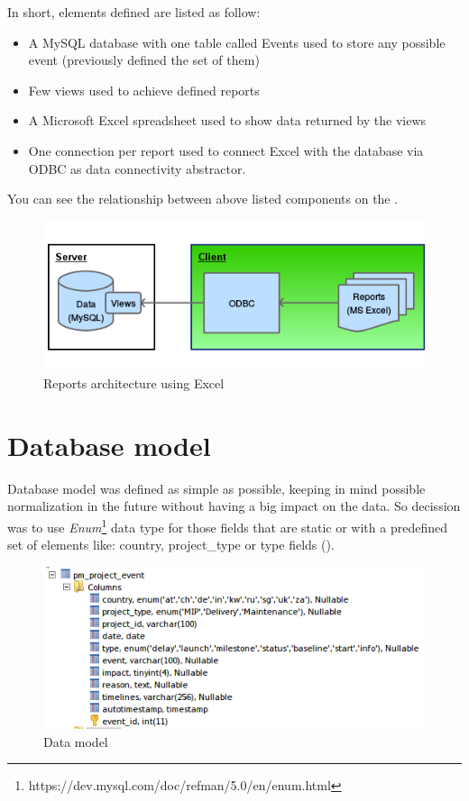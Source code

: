 In short, elements defined are listed as follow:
\begin{itemize}
  \item A MySQL database with one table called Events used to store any possible
  event (previously defined the set of them)
  \item Few views used to achieve defined reports
  \item A Microsoft Excel spreadsheet used to show data returned by the views
  \item One connection per report used to connect Excel with the database
  via ODBC as data connectivity abstractor. 
\end{itemize}

You can see the relationship between above listed components on the 
.
 
\begin{figure}[ht!]
	\centering
   	\includegraphics[width=1\textwidth]{./resources/excel_architecture.png}
   	\caption{Reports architecture using Excel}
   	\label{f_excel_architecture}
\end{figure}

\section{Database model}
Database model was defined as simple as possible, keeping in mind
possible normalization in the future without having a big impact on the data. So
decission was to use
\emph{Enum}\footnote{https://dev.mysql.com/doc/refman/5.0/en/enum.html} data
type for those fields that are static or with a predefined set of
elements like: country, project\_type or  type fields
().

\begin{figure}[ht!]
	\centering
   	\includegraphics[width=1\textwidth]{./resources/data_model.png}
   	\caption{Data model}
   	\label{f_data_model}
\end{figure}

